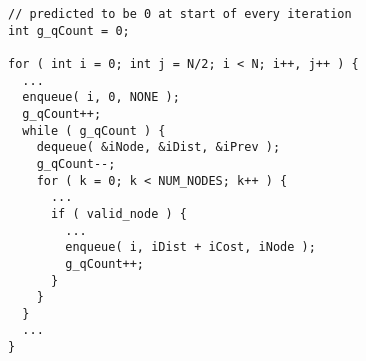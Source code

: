\begin{lstlisting}[morekeywords={g_qCount},belowskip=0pt]
// predicted to be 0 at start of every iteration
int g_qCount = 0;

for ( int i = 0; int j = N/2; i < N; i++, j++ ) {
  ...
  enqueue( i, 0, NONE );
  g_qCount++;
  while ( g_qCount ) {
    dequeue( &iNode, &iDist, &iPrev );
    g_qCount--;
    for ( k = 0; k < NUM_NODES; k++ ) {
      ...
      if ( valid_node ) {
        ...
        enqueue( i, iDist + iCost, iNode );
        g_qCount++;
      }
    }
  }
  ...
}

\end{lstlisting}

